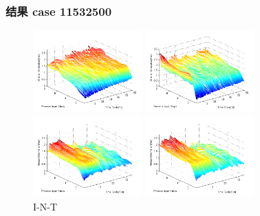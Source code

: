 \documentclass{beamer}
\begin{document}
\begin{CJK}{UTF8}{gkai}
\begin{frame}
\frametitle{结果 case 11532500}

 
 \begin{figure}
\begin{minipage}{0.48\linewidth}
  \centerline{\includegraphics[width=4.2cm]{zs.png}}
 
\end{minipage}
\hfill
\begin{minipage}{.48\linewidth}
  \centerline{\includegraphics[width=4.2cm]{zsr.png}}
 
\end{minipage}
\vfill
\begin{minipage}{0.48\linewidth}
  \centerline{\includegraphics[width=4.2cm]{z.png}}
 
\end{minipage}
\hfill
\begin{minipage}{0.48\linewidth}
  \centerline{\includegraphics[width=4.2cm]{zr.png}}
 
\end{minipage}
\caption{I-N-T}
\label{fig:res}
\end{figure}
 



\end{frame}
\end{CJK}
\end{document}
